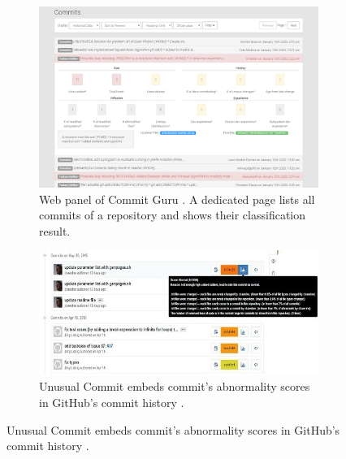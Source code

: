 \begin{figure}[p!]
	\centering
	
	\begin{subfigure}[t]{\textwidth}
		\centering
		\includegraphics[width=.75\textwidth]{images/ui/commitguru/screenshot-repo-commits-buggy-smaller}
		\caption{Web panel of Commit Guru \cite{Rosen2015}. A dedicated page lists all commits of a repository and shows their classification result.}
		\label{fig:ui-commitguru}
	\end{subfigure}
	
	\begin{subfigure}[t]{.75\textwidth}
		\includegraphics[width=\textwidth]{images/ui/unusualcommits/github-integration2-smaller}
		\caption{Unusual Commit embeds commit's abnormality scores in GitHub's commit history \cite{Goyal2017}.}
		\label{fig:ui-unusualcommits-history}
	\end{subfigure}
	

\end{figure}

